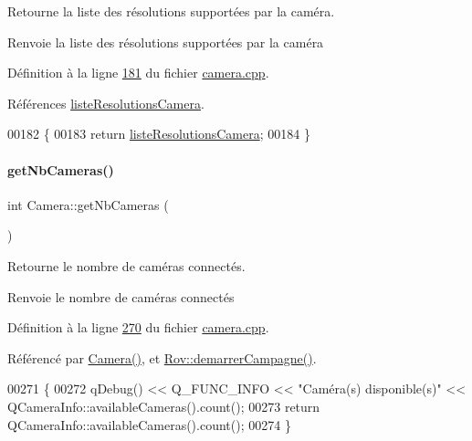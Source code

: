 Retourne la liste des résolutions supportées par la caméra. 

\begin{DoxyReturn}{Renvoie}
la liste des résolutions supportées par la caméra 
\end{DoxyReturn}


Définition à la ligne \hyperlink{camera_8cpp_source_l00181}{181} du fichier \hyperlink{camera_8cpp_source}{camera.\+cpp}.



Références \hyperlink{camera_8h_source_l00071}{liste\+Resolutions\+Camera}.


\begin{DoxyCode}
00182 \{
00183     \textcolor{keywordflow}{return} \hyperlink{class_camera_a96af62eaf7828664865b56e7c69e771c}{listeResolutionsCamera};
00184 \}
\end{DoxyCode}
\mbox{\label{class_camera_a116b3869ff0647c851715605a1938a3c}} 
\paragraph{\texorpdfstring{get\+Nb\+Cameras()}{getNbCameras()}}
{\footnotesize\ttfamily int Camera\+::get\+Nb\+Cameras (\begin{DoxyParamCaption}{ }\end{DoxyParamCaption})\hspace{0.3cm}{\ttfamily [static]}}



Retourne le nombre de caméras connectés. 

\begin{DoxyReturn}{Renvoie}
le nombre de caméras connectés 
\end{DoxyReturn}


Définition à la ligne \hyperlink{camera_8cpp_source_l00270}{270} du fichier \hyperlink{camera_8cpp_source}{camera.\+cpp}.



Référencé par \hyperlink{camera_8cpp_source_l00012}{Camera()}, et \hyperlink{rov_8cpp_source_l00123}{Rov\+::demarrer\+Campagne()}.


\begin{DoxyCode}
00271 \{
00272     qDebug() << Q\_FUNC\_INFO  << \textcolor{stringliteral}{"Caméra(s) disponible(s)"} << QCameraInfo::availableCameras().count();
00273     \textcolor{keywordflow}{return} QCameraInfo::availableCameras().count();
00274 \}
\end{DoxyCode}
\mbox{\label{class_camera_a9b27a8a444006f40548a9a4ecf4d7256}} 
